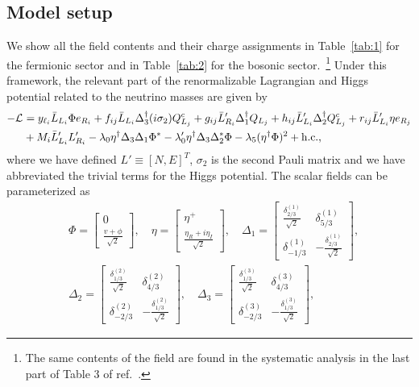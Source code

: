 \documentclass[%
showkeys,12pt,
preprint,preprintnumbers,nofootinbib,
groupedaddress,superscriptaddress,amsmath,amssymb]{revtex4}
\newcommand{\nn}{\nonumber}
\numberwithin{equation}{section}
\begin{document}
\subsection{ Model setup}
We show all the field contents and their charge assignments in 
Table~\ref{tab:1} for the fermionic sector and  in Table~\ref{tab:2} for the 
bosonic sector.~\footnote{{The same contents of the field are found in the systematic analysis in the last part of Table 3 of ref.~\cite{Chen:2014ska}.}} 
Under this framework, the relevant part of the renormalizable Lagrangian 
and Higgs potential related to the neutrino masses are given by
\begin{align}
\label{eq:Yukawa}
-{\cal L}^{}&=
y_{\ell_{i}}\bar L_{L_i }\Phi e_{R_i} 
+ f_{ij}\bar L_{L_i} \Delta^{\dag}_3 (i\sigma_2) Q^c_{L_j}
+g_{ij} \bar L'_{R_i} \Delta^\dag_1 Q_{L_j} 
+h_{ij} \bar L'_{L_i} \Delta^\dag_2 Q^c_{L_j} 
+r_{ij} \bar L'_{L_i} \eta e_{R_j}\nn\\
&+ M_i \bar L'_{L_i} L'_{R_i}
-\lambda_0 \eta^\dag \Delta_3 \Delta_1 \Phi^* -\lambda'_0 \eta^\dag \Delta_3 \Delta_2^* \Phi
-\lambda_5(\eta^\dag \Phi)^2
+{\rm h.c.},
\end{align}
where we have defined $L'\equiv [N,E]^T$, $\sigma_2$ is the second 
Pauli matrix and we have abbreviated the trivial terms for the Higgs potential.
The scalar fields can be parameterized as 
\begin{align}
&\Phi =\left[
\begin{array}{c}
0\\%
\frac{v+\phi}{\sqrt2}
\end{array}\right],\quad 
\eta =\left[
\begin{array}{c}
\eta^+\\
\frac{\eta_R+i\eta_I}{\sqrt2}
\end{array}\right],\quad 
\Delta_1 =\left[
\begin{array}{cc}
\frac{\delta_{2/3}^{(1)}}{\sqrt2} & \delta_{5/3}^{(1)} \\
\delta_{-1/3}^{(1)} & -\frac{\delta_{2/3}^{(1)}}{\sqrt2}
\end{array}\right],\nn\\
&
\Delta_2 =\left[
\begin{array}{cc}
\frac{\delta_{1/3}^{(2)}}{\sqrt2} & \delta_{4/3}^{(2)} \\
\delta_{-2/3}^{(2)} & -\frac{\delta_{1/3}^{(2)}}{\sqrt2}
\end{array}\right],\quad
\Delta_3 =\left[
\begin{array}{cc}
\frac{\delta_{1/3}^{(3)}}{\sqrt2} & \delta_{4/3}^{(3)} \\
\delta_{-2/3}^{(3)} & -\frac{\delta_{1/3}^{(3)}}{\sqrt2}
\end{array}\right],
\label{component}
\end{align}
\end{document}
